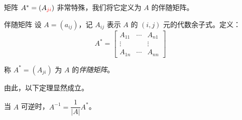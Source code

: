 矩阵 $A^* = (A_{\textcolor{red}{ji}})$ 非常特殊，我们将它定义为 $A$ 的伴随矩阵。

\begin{definition}{伴随矩阵}
	设 $A = (a_{ij})$，记 $A_{ij}$ 表示 $A$ 的 $(i, j)$ 元的代数余子式。定义：
	$$
	A^* =
	\begin{bmatrix}
		A_{11} & \cdots & A_{n1}
		\\
		\vdots & & \vdots
		\\
		A_{1n} & \cdots & A_{nn}
	\end{bmatrix}
	$$

	称 $A^* = (A_{ji})$ 为 $A$ 的\emph{伴随矩阵}。
\end{definition}

由此，以下定理显然成立。

\begin{theorem}
	当 $A$ 可逆时，$A^{-1} = \dfrac{1}{|A|} A^*$。
\end{theorem}